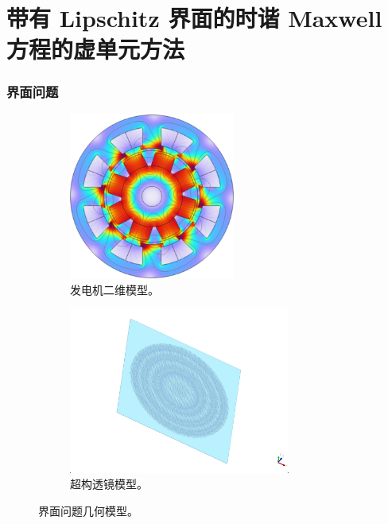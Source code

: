 \documentclass[notheorems,serif]{beamer}
\begin{document}
\section{带有 Lipschitz 界面的时谐 Maxwell 方程的虚单元方法}
\begin{frame}
  \frametitle{界面问题}
  \begin{figure}[htpb]
      \centering
      \begin{subfigure}[t]{0.49\linewidth}
          \centering
          \includegraphics[width=0.6\textwidth]{../figures/big.png}
          \caption{发电机二维模型。}
      \end{subfigure}%
      \begin{subfigure}[t]{0.49\linewidth}
          \centering
          \includegraphics[width=0.8\textwidth]{../figures/bbig.png}
          \caption{超构透镜模型。}
      \end{subfigure}
  \caption{界面问题几何模型。}
  \end{figure}

\end{frame}
\end{document}
